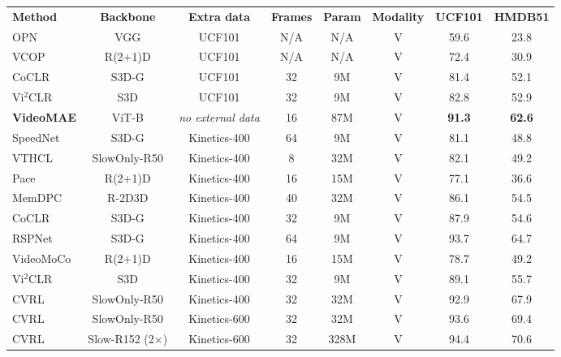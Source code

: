 \documentclass{article}
\newcommand{\tablestyle}[2]{\setlength{\tabcolsep}{#1}\renewcommand{\arraystretch}{#2}\centering\footnotesize}
\begin{document}
\begin{table}[t!] 
\tablestyle{3.0pt}{1.05}
\begin{tabular}{l|c|c|c|c|c|c|c}
	\bfseries Method &\bfseries  Backbone & \bfseries Extra data   & \textbf{Frames} & \bfseries Param &\bfseries  Modality & \bfseries UCF101 & \bfseries HMDB51 \\ 
	\shline
	OPN~\cite{opn} & VGG & UCF101  & N/A &  N/A &  V & 59.6 & 23.8 \\
	VCOP~\cite{vcop} & R(2+1)D &  UCF101  & N/A &  N/A & V & 72.4 & 30.9 \\
	CoCLR~\cite{han2020coclr}  &  S3D-G &  UCF101  & 32 & 9M  & V & 81.4 &  52.1   \\
	Vi$^2$CLR~\cite{Diba_2021_ICCV}  & S3D & UCF101 & 32  & 9M  & V & 82.8 & 52.9  \\
	\shline
	\textbf{VideoMAE} & ViT-B & \emph{no external data} & 16  & 87M & V & \textbf{91.3} & \textbf{62.6} \\
	\hline \hline 
	SpeedNet~\cite{speedNet}  & S3D-G   &  Kinetics-400   & 64 & 9M   & V &  81.1 & 48.8  \\
	VTHCL~\cite{vthcl}  & SlowOnly-R50  & Kinetics-400  &  8  & 32M  & V & 82.1 & 49.2  \\  
    Pace~\cite{wang2020self}  &  R(2+1)D  &  Kinetics-400  & 16  & 15M & V  & 77.1 & 36.6  \\
    MemDPC~\cite{memdpc}   & R-2D3D  & Kinetics-400  & 40 &  32M  & V & 86.1 & 54.5 \\
	CoCLR~\cite{han2020coclr}  &  S3D-G & Kinetics-400    & 32 & 9M  & V & 87.9 & 54.6   \\
	RSPNet~\cite{rspnet}  & S3D-G & Kinetics-400 & 64  & 9M &V  & 93.7 & 64.7 \\
	VideoMoCo~\cite{pan2021videomoco} & R(2+1)D  & Kinetics-400 & 16  & 15M & V & 78.7 & 49.2  \\
	Vi$^2$CLR~\cite{Diba_2021_ICCV}  & S3D & Kinetics-400 & 32  & 9M  & V & 89.1 & 55.7  \\
	CVRL~\cite{cvrl}  & SlowOnly-R50& Kinetics-400  &  32  & 32M  & V & 92.9 & 67.9  \\ 
	CVRL~\cite{cvrl} & SlowOnly-R50 & Kinetics-600 &  32  & 32M  & V & 93.6 & 69.4  \\ 
	CVRL~\cite{cvrl}  & Slow-R152 (2$ \times $) & Kinetics-600 & 32 & 328M & V & 94.4 & 70.6  \\ 


\end{tabular}
\end{table}
\end{document}

